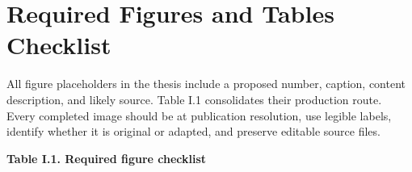 \chapter{Required Figures and Tables Checklist}\label{ch:required-figures-and-tables-checklist}

All figure placeholders in the thesis include a proposed number,
caption, content description, and likely source. Table I.1 consolidates
their production route. Every completed image should be at publication
resolution, use legible labels, identify whether it is original or
adapted, and preserve editable source files.

\clearpage
\begin{landscape}
\par\medskip\noindent\singlespacing
{}
\textbf{Table I.1. Required figure checklist}\par


\end{landscape}
